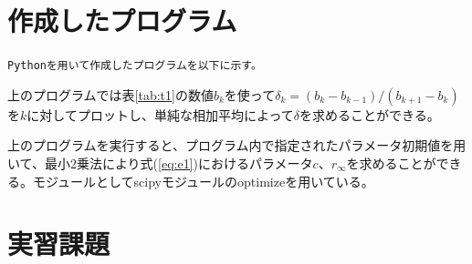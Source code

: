 \documentclass{jsarticle}
\begin{document}
\section{作成したプログラム}
\tt{Python}を用いて作成したプログラムを以下に示す。
 
 上のプログラムでは表\ref{tab:t1}の数値$b_{k}$を使って$\delta_{k}=(b_{k}-b_{k-1})/(b_{k+1}-b_{k})$を$k$に対してプロットし、単純な相加平均によって$\delta$を求めることができる。
 
 上のプログラムを実行すると、プログラム内で指定されたパラメータ初期値を用いて、最小2乗法により式(\ref{eq:e1})におけるパラメータ$c$、$r_{\infty}$を求めることができる。モジュールとしてscipyモジュールのoptimizeを用いている。

\section{実習課題}
\end{document}
